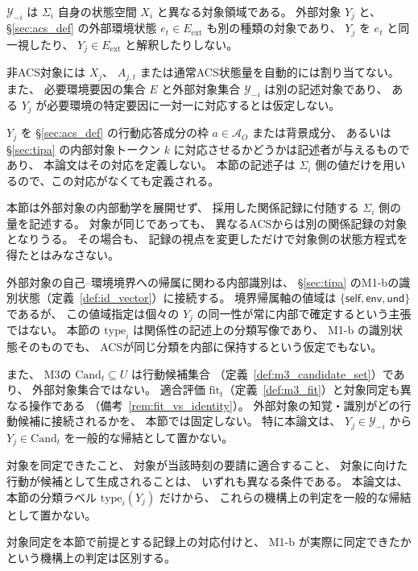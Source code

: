 \begin{remark}[外部対象集合の役割]
\label{rem:external_object_role}
$\mathcal Y_{-i}$ は $\Sigma_i$ 自身の状態空間 $X_i$ と異なる対象領域である。
外部対象 $Y_j$ と、
\S\ref{sec:acs_def} の外部環境状態 $e_t\in E_{\mathrm{ext}}$ も別の種類の対象であり、
$Y_j$ を $e_t$ と同一視したり、
$Y_j\in E_{\mathrm{ext}}$ と解釈したりしない。

非ACS対象には $X_j$、
$A_{j,t}$ または通常ACS状態量を自動的には割り当てない。
また、
必要環境要因の集合 $E$ と外部対象集合 $\mathcal Y_{-i}$ は別の記述対象であり、
ある $Y_j$ が必要環境の特定要因に一対一に対応するとは仮定しない。

$Y_j$ を \S\ref{sec:acs_def} の行動応答成分の枠 $a\in\mathcal A_O$ または背景成分、
あるいは \S\ref{sec:tipa} の内部対象トークン $k$ に対応させるかどうかは記述者が与えるものであり、
本論文はその対応を定義しない。
本節の記述子は $\Sigma_i$ 側の値だけを用いるので、この対応がなくても定義される。

本節は外部対象の内部動学を展開せず、
採用した関係記録に付随する $\Sigma_i$ 側の量を記述する。
対象が同じであっても、
異なるACSからは別の関係記録の対象となりうる。
その場合も、
記録の視点を変更しただけで対象側の状態方程式を得たとはみなさない。
\end{remark}

\begin{remark}[外部対象の識別と行動候補との区別]
\label{rem:external_object_cand}
外部対象の自己--環境境界への帰属に関わる内部識別は、
\S\ref{sec:tipa} のM1-bの識別状態（定義~\ref{def:id_vector}）に接続する。
境界帰属軸の値域は $\{\mathsf{self},\mathsf{env},\mathsf{und}\}$ であるが、
この値域指定は個々の $Y_j$ の同一性が常に内部で確定するという主張ではない。
本節の $\mathrm{type}_i$ は関係性の記述上の分類写像であり、
M1-b の識別状態そのものでも、
ACSが同じ分類を内部に保持するという仮定でもない。

また、
M3の $\mathrm{Cand}_t\subseteq U$ は行動候補集合
（定義~\ref{def:m3_candidate_set}）であり、
外部対象集合ではない。
適合評価 $\mathrm{fit}_t$（定義~\ref{def:m3_fit}）と対象同定も異なる操作である
（備考~\ref{rem:fit_vs_identity}）。
外部対象の知覚・識別がどの行動候補に接続されるかを、
本節では固定しない。
特に本論文は、
$Y_j\in\mathcal Y_{-i}$ から $Y_j\in\mathrm{Cand}_t$ を一般的な帰結として置かない。

対象を同定できたこと、
対象が当該時刻の要請に適合すること、
対象に向けた行動が候補として生成されることは、
いずれも異なる条件である。
本論文は、本節の分類ラベル $\mathrm{type}_i(Y_j)$ だけから、
これらの機構上の判定を一般的な帰結として置かない。

対象同定を本節で前提とする記録上の対応付けと、
M1-b が実際に同定できたかという機構上の判定は区別する。
\end{remark}

